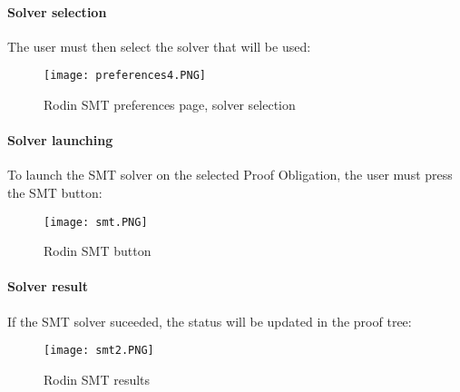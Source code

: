 \paragraph{Solver selection}
The user must then select the solver that will be used:

\begin{figure}
\centering
\texttt{[image: preferences4.PNG]}
\caption{Rodin SMT preferences page, solver selection} 
\label{Fig: Solver selection in SMT preferences}
\end{figure}

\paragraph{Solver launching}
To launch the SMT solver on the selected Proof Obligation, the user must press the SMT button:
\begin{figure}
\centering
\texttt{[image: smt.PNG]}
\caption{Rodin SMT button} 
\label{Fig: Launch SMT in Rodin}
\end{figure}

\paragraph{Solver result}
If the SMT solver suceeded, the status will be updated in the proof tree:

\begin{figure}
\centering
\texttt{[image: smt2.PNG]}
\caption{Rodin SMT results} 
\label{Fig: SMT results}
\end{figure}


